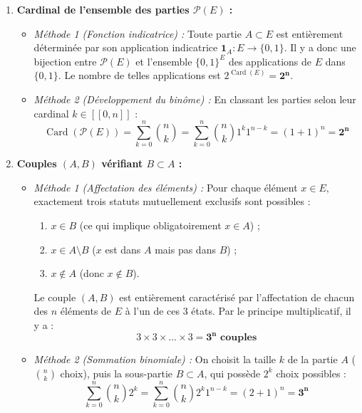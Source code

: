 \documentclass[11pt,a4paper]{article}
\newcommand{\un}{\mathbf{1}}
\begin{document}
\begin{correctionbox}
\begin{enumerate}[label=\arabic*.]
    \item \textbf{Cardinal de l'ensemble des parties $\mathscr{P}(E)$ :}
    \begin{itemize}[label=$\bullet$]
        \item \emph{Méthode 1 (Fonction indicatrice) :} Toute partie $A \subset E$ est entièrement déterminée par son application indicatrice $\un_A : E \to \{0, 1\}$.
        Il y a donc une bijection entre $\mathscr{P}(E)$ et l'ensemble $\{0, 1\}^E$ des applications de $E$ dans $\{0, 1\}$.
        Le nombre de telles applications est $2^{\operatorname{Card}(E)} = \mathbf{2^n}$.
        \item \emph{Méthode 2 (Développement du binôme) :} En classant les parties selon leur cardinal $k \in [\![0, n]\!]$ :
        \[
        \operatorname{Card}(\mathscr{P}(E)) = \sum_{k=0}^n \binom{n}{k} = \sum_{k=0}^n \binom{n}{k} 1^k 1^{n-k} = (1 + 1)^n = \mathbf{2^n}
        \]
    \end{itemize}

    \item \textbf{Couples $(A, B)$ vérifiant $B \subset A$ :}
    \begin{itemize}[label=$\bullet$]
        \item \emph{Méthode 1 (Affectation des éléments) :} Pour chaque élément $x \in E$, exactement trois statuts mutuellement exclusifs sont possibles :
        \begin{enumerate}[label=(\roman*)]
            \item $x \in B$ (ce qui implique obligatoirement $x \in A$) ;
            \item $x \in A \setminus B$ ($x$ est dans $A$ mais pas dans $B$) ;
            \item $x \notin A$ (donc $x \notin B$).
        \end{enumerate}
        Le couple $(A, B)$ est entièrement caractérisé par l'affectation de chacun des $n$ éléments de $E$ à l'un de ces 3 états.
        Par le principe multiplicatif, il y a :
        \[
        3 \times 3 \times \dots \times 3 = \mathbf{3^n\text{ couples}}
        \]
        \item \emph{Méthode 2 (Sommation binomiale) :} On choisit la taille $k$ de la partie $A$ ($\binom{n}{k}$ choix), puis la sous-partie $B \subset A$, qui possède $2^k$ choix possibles :
        \[
        \sum_{k=0}^n \binom{n}{k} 2^k = \sum_{k=0}^n \binom{n}{k} 2^k 1^{n-k} = (2 + 1)^n = \mathbf{3^n}
        \]
    \end{itemize}


\end{enumerate}
\end{correctionbox}
\end{document}
